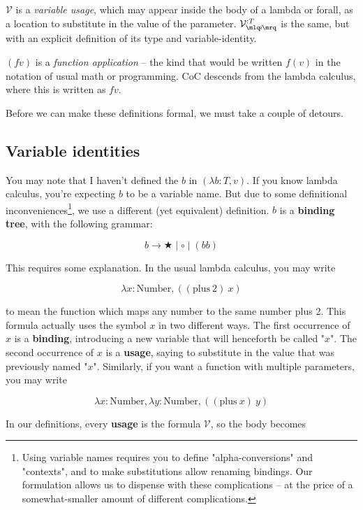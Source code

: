 \documentclass{article}
\newcommand{\usage}{\mathcal{V}}
\newcommand{\usageKnown}[2]{{\usage_{\mlq\hspace{-0.06em}#2\hspace{-0.06em}\mrq}^{:#1}}}
\newcommand{\bindvariable}{\bigstar}
\newcommand{\bindnotthis}{\circ}
\begin{document}
  $\usage$ is a \emph{variable usage}, which may appear inside the body of a lambda or forall, as a location to substitute in the value of the parameter. $\usageKnown{T}{i}$ is the same, but with an explicit definition of its type and variable-identity.
  
  $(f v)$ is a \emph{function application} – the kind that would be written $f(v)$ in the notation of usual math or programming. CoC descends from the lambda calculus, where this is written as $f v$.
  
  Before we can make these definitions formal, we must take a couple of detours.
  
  

  \subsection{Variable identities}

  You may note that I haven't defined the $b$ in $(\lambda b:T,v)$. If you know lambda calculus, you're expecting $b$ to be a variable name. But due to some definitional inconveniences\footnote{Using variable names requires you to define "alpha-conversions" and "contexts", and to make substitutions allow renaming bindings. Our formulation allows us to dispense with these complications – at the price of a somewhat-smaller amount of different complications.}, we use a different (yet equivalent) definition. $b$ is a \textbf{binding tree}, with the following grammar:

  \[b \rightarrow \bindvariable \mid \bindnotthis \mid (b b) \]

  This requires some explanation. In the usual lambda calculus, you may write

  \[ \lambda x : \mathrm{Number}, ((\mathrm{plus}\ 2)\ x) \]

  to mean the function which maps any number to the same number plus 2. This formula actually uses the symbol $x$ in two different ways. The first occurrence of $x$ is a \textbf{binding}, introducing a new variable that will henceforth be called "$x$". The second occurrence of $x$ is a \textbf{usage}, saying to substitute in the value that was previously named "$x$". Similarly, if you want a function with multiple parameters, you may write
  
  \[ \lambda x : \mathrm{Number}, \lambda y : \mathrm{Number}, ((\mathrm{plus}\ x)\ y) \]

  In our definitions, every \textbf{usage} is the formula $\usage$, so the body becomes
  
\end{document}
